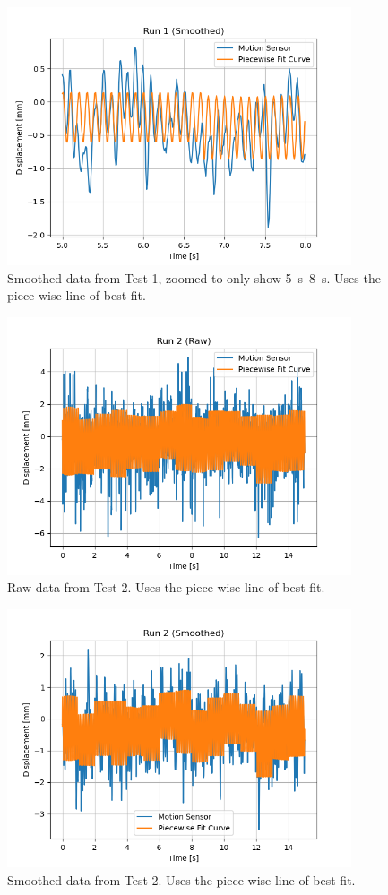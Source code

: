 \documentclass[12 pt]{report}
\begin{document}
\begin{figure}[htbp]
\centering
\includegraphics[width=4in]{images/Graphs/Run_1-Smoothed-PW-Zoomed}
\caption{Smoothed data from Test \num{1}, zoomed to only show \qtyrange{5}{8}{\s}. Uses the piece-wise line of best fit.}
\end{figure}


\begin{figure}[htbp]
\centering
\includegraphics[width=4in]{images/Graphs/Run_2-Raw-PW}
\caption{Raw data from Test \num{2}. Uses the piece-wise line of best fit.}
\end{figure}

\begin{figure}[htbp]
\centering
\includegraphics[width=4in]{images/Graphs/Run_2-Smoothed-PW}
\caption{Smoothed data from Test \num{2}. Uses the piece-wise line of best fit.}
\end{figure}
\end{document}
